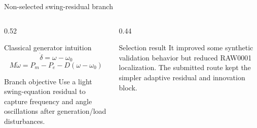 \documentclass[aspectratio=169,10pt,t]{beamer}
\begin{document}
\fi
\iffalse
\begin{frame}{Non-selected swing-residual branch}
\small
\begin{columns}[T,totalwidth=\textwidth]
\begin{column}{0.52\textwidth}
\begin{block}{Classical generator intuition}
\[
\dot{\delta}=\omega-\omega_0
\]
\[
M\dot{\omega}=P_m-P_e-D(\omega-\omega_0)
\]
\end{block}
\begin{exampleblock}{Branch objective}
Use a light swing-equation residual to capture frequency and angle oscillations after generation/load disturbances.
\end{exampleblock}
\end{column}
\begin{column}{0.44\textwidth}
\centering
{}
\vspace{2mm}
\begin{alertblock}{Selection result}
It improved some synthetic validation behavior but reduced RAW0001 localization. The submitted route kept the simpler adaptive residual and innovation block.
\end{alertblock}
\end{column}
\end{columns}
\end{frame}

\end{document}
